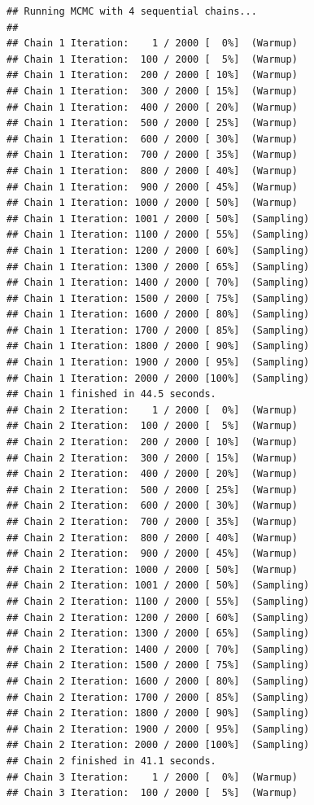 \documentclass[
]{article}
\begin{document}
\begin{verbatim}
## Running MCMC with 4 sequential chains...
## 
## Chain 1 Iteration:    1 / 2000 [  0%]  (Warmup) 
## Chain 1 Iteration:  100 / 2000 [  5%]  (Warmup) 
## Chain 1 Iteration:  200 / 2000 [ 10%]  (Warmup) 
## Chain 1 Iteration:  300 / 2000 [ 15%]  (Warmup) 
## Chain 1 Iteration:  400 / 2000 [ 20%]  (Warmup) 
## Chain 1 Iteration:  500 / 2000 [ 25%]  (Warmup) 
## Chain 1 Iteration:  600 / 2000 [ 30%]  (Warmup) 
## Chain 1 Iteration:  700 / 2000 [ 35%]  (Warmup) 
## Chain 1 Iteration:  800 / 2000 [ 40%]  (Warmup) 
## Chain 1 Iteration:  900 / 2000 [ 45%]  (Warmup) 
## Chain 1 Iteration: 1000 / 2000 [ 50%]  (Warmup) 
## Chain 1 Iteration: 1001 / 2000 [ 50%]  (Sampling) 
## Chain 1 Iteration: 1100 / 2000 [ 55%]  (Sampling) 
## Chain 1 Iteration: 1200 / 2000 [ 60%]  (Sampling) 
## Chain 1 Iteration: 1300 / 2000 [ 65%]  (Sampling) 
## Chain 1 Iteration: 1400 / 2000 [ 70%]  (Sampling) 
## Chain 1 Iteration: 1500 / 2000 [ 75%]  (Sampling) 
## Chain 1 Iteration: 1600 / 2000 [ 80%]  (Sampling) 
## Chain 1 Iteration: 1700 / 2000 [ 85%]  (Sampling) 
## Chain 1 Iteration: 1800 / 2000 [ 90%]  (Sampling) 
## Chain 1 Iteration: 1900 / 2000 [ 95%]  (Sampling) 
## Chain 1 Iteration: 2000 / 2000 [100%]  (Sampling) 
## Chain 1 finished in 44.5 seconds.
## Chain 2 Iteration:    1 / 2000 [  0%]  (Warmup) 
## Chain 2 Iteration:  100 / 2000 [  5%]  (Warmup) 
## Chain 2 Iteration:  200 / 2000 [ 10%]  (Warmup) 
## Chain 2 Iteration:  300 / 2000 [ 15%]  (Warmup) 
## Chain 2 Iteration:  400 / 2000 [ 20%]  (Warmup) 
## Chain 2 Iteration:  500 / 2000 [ 25%]  (Warmup) 
## Chain 2 Iteration:  600 / 2000 [ 30%]  (Warmup) 
## Chain 2 Iteration:  700 / 2000 [ 35%]  (Warmup) 
## Chain 2 Iteration:  800 / 2000 [ 40%]  (Warmup) 
## Chain 2 Iteration:  900 / 2000 [ 45%]  (Warmup) 
## Chain 2 Iteration: 1000 / 2000 [ 50%]  (Warmup) 
## Chain 2 Iteration: 1001 / 2000 [ 50%]  (Sampling) 
## Chain 2 Iteration: 1100 / 2000 [ 55%]  (Sampling) 
## Chain 2 Iteration: 1200 / 2000 [ 60%]  (Sampling) 
## Chain 2 Iteration: 1300 / 2000 [ 65%]  (Sampling) 
## Chain 2 Iteration: 1400 / 2000 [ 70%]  (Sampling) 
## Chain 2 Iteration: 1500 / 2000 [ 75%]  (Sampling) 
## Chain 2 Iteration: 1600 / 2000 [ 80%]  (Sampling) 
## Chain 2 Iteration: 1700 / 2000 [ 85%]  (Sampling) 
## Chain 2 Iteration: 1800 / 2000 [ 90%]  (Sampling) 
## Chain 2 Iteration: 1900 / 2000 [ 95%]  (Sampling) 
## Chain 2 Iteration: 2000 / 2000 [100%]  (Sampling) 
## Chain 2 finished in 41.1 seconds.
## Chain 3 Iteration:    1 / 2000 [  0%]  (Warmup) 
## Chain 3 Iteration:  100 / 2000 [  5%]  (Warmup) 

\end{verbatim}
\end{document}
